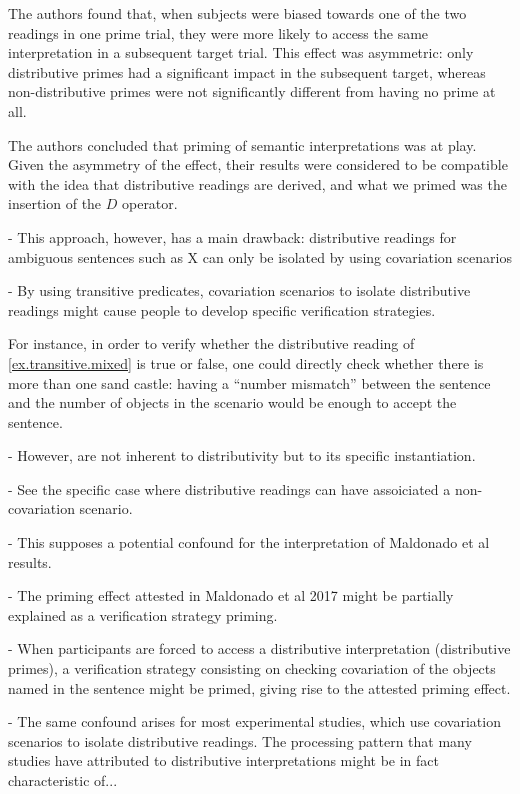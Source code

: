 \documentclass[a4paper]{article}
\newcommand{\nbMM}[1]{{\leavevmode\color{red}{\scriptsize#1}}}
\begin{document}
\noindent The authors found that, when subjects were biased towards one of the two readings in one prime trial, they were more likely to access the same interpretation in a subsequent target trial. This effect was asymmetric: only distributive primes had a significant impact in the subsequent target, whereas non-distributive primes were not  significantly different from having no prime at all.  \nbMM{Maybe take out the last paragraph. I am unsure of how much information I should give at this point.}

\noindent The authors concluded that priming of semantic interpretations was at play. Given the asymmetry of the effect, their results were considered to be compatible with the idea that distributive readings are derived, and what we primed was the insertion of the $D$ operator.

- This approach, however, has a main drawback: distributive readings for ambiguous sentences such as X can only be isolated by using covariation scenarios 

- By using transitive predicates, covariation scenarios to isolate distributive readings might cause people to develop specific verification strategies. 

For instance, in order to verify whether the distributive reading of \ref{ex.transitive.mixed} is true or false, one could directly check whether there is more than one sand castle: having a ``number mismatch'' between the sentence and the number of objects in the scenario would be enough to accept the sentence. 

- However,  are not inherent to distributivity but to its specific instantiation. 




- See the specific case where distributive readings can have assoiciated a non-covariation scenario. 

- This supposes a potential confound for the interpretation of Maldonado et al results.

- The priming effect attested in Maldonado et al 2017 might be partially explained as a verification strategy priming. 

- When participants are forced to access a distributive interpretation (distributive primes), a verification strategy consisting on checking covariation of the objects named in the sentence might be primed, giving rise to the attested priming effect. 



- The same confound arises for most experimental studies, which use covariation scenarios to isolate distributive readings. The processing pattern that many studies have attributed to distributive interpretations might be in fact characteristic of... 
\end{document}
